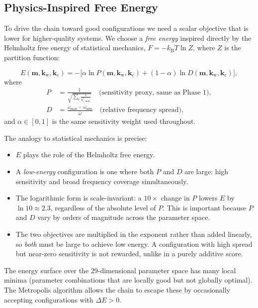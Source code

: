 \documentclass[11pt, letterpaper]{article}
\begin{document}
\subsection{Physics-Inspired Free Energy}

To drive the chain toward good configurations we need a scalar objective that
is lower for higher-quality systems.  We choose a \emph{free energy} inspired
directly by the Helmholtz free energy of statistical mechanics,
$F = -k_\mathrm{B}T\ln Z$, where $Z$ is the partition function:

\begin{equation}
  \label{eq:energy}
  \boxed{
  E(\mathbf{m}, \mathbf{k}_\mathrm{w}, \mathbf{k}_\mathrm{c})
  = -\bigl[\alpha\ln P(\mathbf{m}, \mathbf{k}_\mathrm{w}, \mathbf{k}_\mathrm{c})
          + (1-\alpha)\ln D(\mathbf{m}, \mathbf{k}_\mathrm{w}, \mathbf{k}_\mathrm{c})\bigr],
  }
\end{equation}
where
\begin{align}
  P &= \frac{1}{\sqrt{\displaystyle\sum_i \frac{1}{b_{i,\max}^2}}}
     \quad \text{(sensitivity proxy, same as Phase~1)}, \\[4pt]
  D &= \frac{\omega_{\max} - \omega_{\min}}{\bar{\omega}}
     \quad \text{(relative frequency spread)},
\end{align}
and $\alpha \in [0,1]$ is the same sensitivity weight used throughout.

The analogy to statistical mechanics is precise:
\begin{itemize}[noitemsep]
  \item $E$ plays the role of the Helmholtz free energy.
  \item A \emph{low-energy} configuration is one where both $P$ and $D$ are
        large: high sensitivity and broad frequency coverage simultaneously.
  \item The logarithmic form is scale-invariant: a $10\times$ change in $P$
        lowers $E$ by $\ln 10 \approx 2.3$, regardless of the absolute level
        of $P$.  This is important because $P$ and $D$ vary by orders of
        magnitude across the parameter space.
  \item The two objectives are multiplied in the exponent rather than added
        linearly, so \emph{both} must be large to achieve low energy.  A
        configuration with high spread but near-zero sensitivity is not
        rewarded, unlike in a purely additive score.
\end{itemize}

The energy surface over the 29-dimensional parameter space has many local
minima (parameter combinations that are locally good but not globally
optimal).  The Metropolis algorithm allows the chain to escape these by
occasionally accepting configurations with $\Delta E > 0$.
\end{document}
